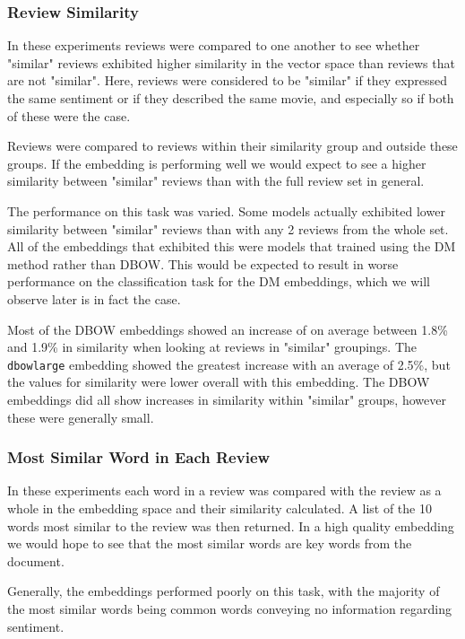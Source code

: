 \documentclass[twocolumn]{article}
\begin{document}
\subsubsection{Review Similarity}

In these experiments reviews were compared to one another to see whether "similar" reviews exhibited higher similarity in the vector space than reviews that are not "similar". Here, reviews were considered to be "similar" if they expressed the same sentiment or if they described the same movie, and especially so if both of these were the case.

Reviews were compared to reviews within their similarity group and outside these groups. If the embedding is performing well we would expect to see a higher similarity between "similar" reviews than with the full review set in general.

The performance on this task was varied. Some models actually exhibited lower similarity between "similar" reviews than with any 2 reviews from the whole set. All of the embeddings that exhibited this were models that trained using the DM method rather than DBOW. This would be expected to result in worse performance on the classification task for the DM embeddings, which we will observe later is in fact the case.

Most of the DBOW embeddings showed an increase of on average between 1.8\% and 1.9\% in similarity when looking at reviews in "similar" groupings. The \texttt{dbowlarge} embedding showed the greatest increase with an average of 2.5\%, but the values for similarity were lower overall with this embedding. The DBOW embeddings did all show increases in similarity within "similar" groups, however these were generally small.

\subsubsection{Most Similar Word in Each Review}

In these experiments each word in a review was compared with the review as a whole in the embedding space and their similarity calculated. A list of the 10 words most similar to the review was then returned. In a high quality embedding we would hope to see that the most similar words are key words from the document.

Generally, the embeddings performed poorly on this task, with the majority of the most similar words being common words conveying no information regarding sentiment.
\end{document}
